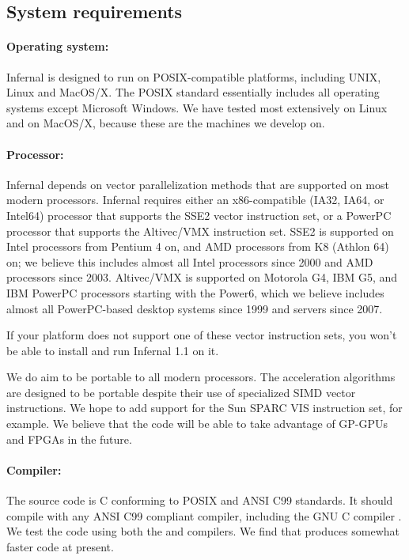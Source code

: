 \subsection{System requirements}

\paragraph{Operating system:} Infernal is designed to run on
POSIX-compatible platforms, including UNIX, Linux and MacOS/X. The
POSIX standard essentially includes all operating systems except
Microsoft Windows. We have tested most extensively on Linux and on
MacOS/X, because these are the machines we develop on.

\paragraph{Processor:} Infernal depends on vector parallelization methods
that are supported on most modern processors. Infernal requires either an
x86-compatible (IA32, IA64, or Intel64) processor that supports the
SSE2 vector instruction set, or a PowerPC processor that supports the
Altivec/VMX instruction set. SSE2 is supported on Intel processors
from Pentium 4 on, and AMD processors from K8 (Athlon 64) on; we
believe this includes almost all Intel processors since 2000 and AMD
processors since 2003. Altivec/VMX is supported on Motorola G4, IBM
G5, and IBM PowerPC processors starting with the Power6, which we
believe includes almost all PowerPC-based desktop systems since 1999
and servers since 2007.

If your platform does not support one of these vector instruction
sets, you won't be able to install and run Infernal 1.1 on it.

We do aim to be portable to all modern processors. The acceleration
algorithms are designed to be portable despite their use of
specialized SIMD vector instructions. We hope to add support for the
Sun SPARC VIS instruction set, for example. We believe that the code
will be able to take advantage of GP-GPUs and FPGAs in the future.

\paragraph{Compiler:} The source code is C conforming to POSIX and ANSI
C99 standards. It should compile with any ANSI C99 compliant compiler,
including the GNU C compiler . We test the code using both
the  and  compilers. We find that 
produces somewhat faster code at present.

